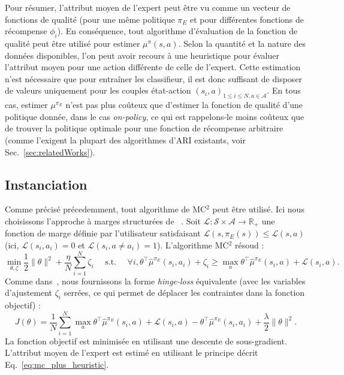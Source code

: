 \documentclass[english,utf8]{./hermes-journal}
\newcommand{\s}{\mathcal{S}}
\newcommand{\A}{\mathcal{A}}
\newcommand{\lc}{\mathcal{L}}
\begin{document}
Pour résumer, l'attribut moyen de l'expert peut être vu comme un vecteur de fonctions de qualité (pour une même politique  $\pi_E$ et pour différentes fonctions de récompense $\phi_i$). En conséquence, tout algorithme d'évaluation de la fonction de qualité peut être utilisé pour estimer $\mu^\pi(s,a)$.
Selon la quantité et la nature des données disponibles, l'on peut avoir recours à une heuristique pour évaluer l'attribut moyen pour une action différente de celle de l'expert. Cette estimation n'est nécessaire que pour entraîner les classifieur, il est donc suffisant de disposer de valeurs uniquement pour les couples état-action $(s_i,a)_{1\leq i \leq N,a\in \A}$.
En tous cas, estimer  $\mu^{\pi_E}$ n'est pas plus coûteux que d'estimer la fonction de qualité d'une politique donnée, dans le cas \emph{on-policy}, ce qui est rappelons-le moins coûteux que de trouver la politique optimale pour une fonction de récompense arbitraire (comme l'exigent la plupart des algorithmes d'ARI existants, voir Sec.~\ref{sec:relatedWorks}).


\subsection{Instanciation}
\label{subsec:practicalApproach:instantiation}

Comme précisé précedemment, tout algorithme de MC$^2$ peut être utilisé. Ici nous choisissons l'approche à marges structurées de ~\cite{Taskar:2005}. Soit
$\lc:\s\times\A\rightarrow\mathbb{R}_+$ une fonction de marge définie par l'utilisateur satisfaisant $\lc(s,\pi_E(s))\leq \lc(s,a)$ (ici,
$\lc(s_i,a_i)=0$ et $\lc(s_i,a\neq a_i)=1$). L'algorithme MC$^2$ résoud :%
\begin{equation}
  \min_{\theta,\zeta}\frac{1}{2}\|\theta\|^2 +
  \frac{\eta}{N}\sum_{i=1}^N \zeta_i \text{~~~~s.t.~~~~} \forall i,
  \theta^\top\hat{\mu}^{\pi_E}(s_i,a_i)+\zeta_i \geq \max_a \theta^\top
  \hat{\mu}^{\pi_E}(s_i,a) + \lc(s_i,a). \label{eq:qp_taskar}
\end{equation}
Comme dans~\cite{Ratliff:2006}, nous fournissons la forme \emph{hinge-loss} équivalente (avec les variables d'ajustement $\zeta_i$ serrées, ce qui permet de déplacer les contraintes dans la fonction objectif) :
\begin{equation}
  J(\theta) = \frac{1}{N}\sum_{i=1}^N \max_a \theta^\top
  \hat{\mu}^{\pi_E}(s_i,a) + \lc(s_i,a) -
  \theta^\top\hat{\mu}^{\pi_E}(s_i,a_i) +
  \frac{\lambda}{2}\|\theta\|^2.
\end{equation}
La fonction objectif est minimisée en utilisant une descente de sous-gradient. L'attribut moyen de l'expert est estimé en utilisant le principe décrit Eq.~\eqref{eq:mc_plus_heuristic}.
\end{document}
